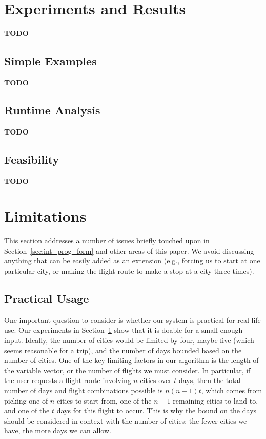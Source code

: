 \documentclass{article}
\begin{document}
\section{Experiments and Results}\label{sec:experiments_results}

{\bf TODO}

\subsection{Simple Examples}
{\bf TODO}

\subsection{Runtime Analysis}
{\bf TODO}

\subsection{Feasibility}
{\bf TODO}


\section{Limitations}\label{sec:limitations}

This section addresses a number of issues briefly touched upon in Section~\ref{sec:int_prog_form} and other areas of this paper. We avoid discussing
anything that can be easily added as an extension (e.g., forcing us to start at one particular city, or making the flight route to make a stop at a
city three times).

\subsection{Practical Usage}

One important question to consider is whether our system is practical for real-life use. Our experiments in Section~\ref{sec:experiments_results} show
that it is doable for a small enough input. Ideally, the number of cities would be limited by four, maybe five (which seems reasonable for a trip),
and the number of days bounded based on the number of cities. One of the key limiting factors in our algorithm is the length of the variable vector,
or the number of flights we must consider. In particular, if the user requests a flight route involving $n$ cities over $t$ days, then the total
number of days and flight combinations possible is $n(n-1)t$, which comes from picking one of $n$ cities to start from, one of the $n-1$ remaining
cities to land to, and one of the $t$ days for this flight to occur. This is why the bound on the days should be considered in context with the number
of cities; the fewer cities we have, the more days we can allow.
\end{document}
